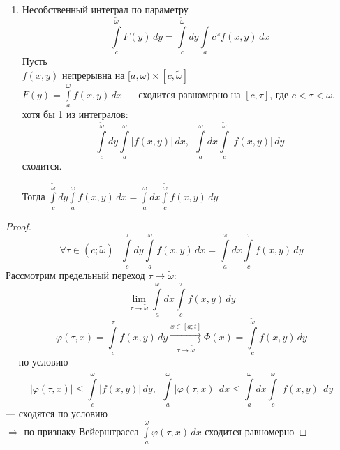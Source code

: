 \begin{properties}
\begin{enumerate}
        \item Несобственный интеграл по параметру
        \[ \int\limits_c^{\tilde \omega} F(y)\,dy = \int\limits_c^{\tilde \omega} dy \int\limits_ac^{\omega} f(x, y)\,dx \]
        Пусть \\
        \phantom{Пусть} $f(x, y)$ непрерывна на $[a, \omega) \times [c, \tilde \omega]$ \\
        \phantom{Пусть} $F(y) = \int\limits_a^{\omega} f(x, y)\,dx$ --- сходится равномерно на $[c, \tau]$, 
        где $c < \tau < \omega$, \\
        \phantom{Пусть} хотя бы 1 из интегралов:
        \[ \int\limits_c^{\tilde \omega} dy \int\limits_a^{\omega} |f(x, y)|\,dx, \ \ 
        \int\limits_a^{\omega} dx \int\limits_c^{\tilde \omega} |f(x, y)|\,dy \]
        \phantom{Пусть} сходится.
        
        Тогда $\int\limits_c^{\tilde \omega} dy \int\limits_a^{\omega} f(x, y)\,dx = 
        \int\limits_a^{\omega} dx \int\limits_c^{\tilde \omega} f(x, y)\,dy$
    \end{enumerate}
        \begin{proof}
            \[ \forall \tau \in (c; \tilde \omega) \ \ \ \int\limits_c^{\tau} dy \int\limits_a^{\omega} f(x, y)\,dx = 
            \int\limits_a^{\omega} dx \int\limits_c^{\tau} f(x, y)\,dy \]
            Рассмотрим предельный переход $\tau \to \tilde \omega$:
            \[ \lim_{\tau \to \tilde \omega} \int\limits_a^{\omega} dx \int\limits_c^{\tau} f(x, y)\,dy \]
            \[ \varphi(\tau, x) = \int\limits_c^{\tau} f(x, y)\,dy \overset{x \in [a; t]}{\underset{\tau \to \tilde \omega}
            {\rightrightarrows}} \Phi(x) = \int\limits_c^{\tilde \omega} f(x, y)\,dy \]
            --- по условию
            \[ |\varphi(\tau, x)| \le \int\limits_c^{\tilde \omega} |f(x, y)|\,dy, \ \ \int\limits_a^{\omega} |\varphi(\tau, x)|\,dx
            \le \int\limits_a^{\omega} dx \int\limits_c^{\tilde \omega} |f(x, y)|\,dy \]
            --- сходятся по условию \\
            $\Rightarrow$ по признаку Вейерштрасса $\int\limits_a^{\omega} \varphi(\tau, x)\,dx$ сходится равномерно
        \end{proof}
    \end{properties}
